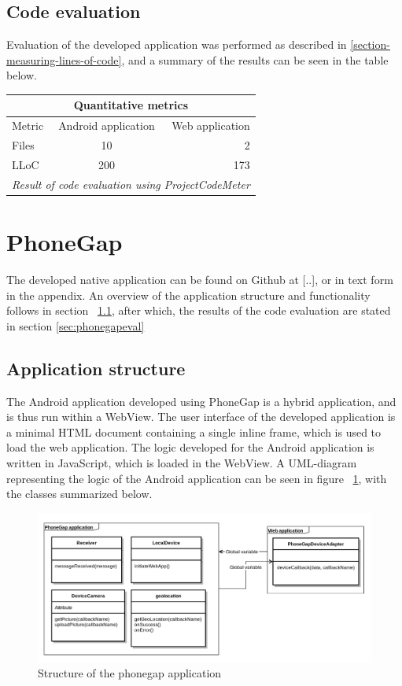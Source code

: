 \subsection{Code evaluation} \label{sec:nativeeval}
Evaluation of the developed application was performed as described in \ref{section-measuring-lines-of-code}, and a summary of the results  can be seen in the table below.

\begin{tabular}{ | l | c | r | }
    \hline
    \multicolumn{3}{|c|}{Quantitative metrics} \\
    \hline
	Metric & Android application &  Web application \\
	\hline
	Files & 10 & 2\\
	LLoC & 200 & 173\\	
	\hline
	\multicolumn{3}{c}{\emph{Result of code evaluation using ProjectCodeMeter}}
\end{tabular}

\section{PhoneGap}
The developed native application can be found on Github at [..], or in text form in the appendix. An overview of the application structure and functionality follows in section ~\ref{sec:phonegapstructure}, after which, the results of the code evaluation are stated in section \ref{sec:phonegapeval}

\subsection{Application structure} \label{sec:phonegapstructure}
The Android application developed using PhoneGap is a hybrid application, and is thus run within a WebView. The user interface of the developed application is a minimal HTML document containing a single inline frame, which is used to load the web application. The logic developed for the Android application is written in JavaScript, which is loaded in the WebView. A UML-diagram representing the logic of the Android application can be seen in figure ~\ref{fig:phonegapuml},  with the classes summarized below.
\begin{figure}[h!]
	\centering
    \includegraphics[width=120mm,natwidth=800,natheight=600]{./img/phonegapuml.png}
    \caption{Structure of the phonegap application}
    \label{fig:phonegapuml}
\end{figure}

